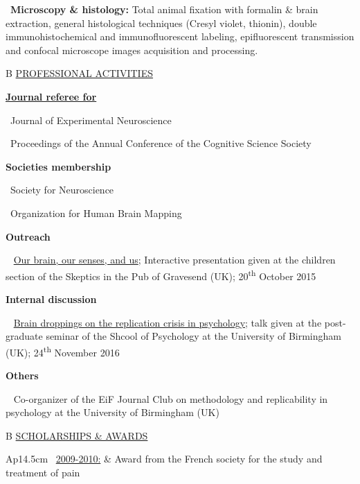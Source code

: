 \documentclass[a4paper,12pt,oneside]{letter}
\begin{document}
{\textbullet~\textbf{Microscopy \& histology:} Total animal fixation with formalin \& brain extraction, general histological techniques (Cresyl violet, thionin), double immunohistochemical and immunofluorescent labeling, epifluorescent transmission and confocal microscope images acquisition and processing.


\medskip 

\begin{tabular}{B}
 \underline{PROFESSIONAL ACTIVITIES}
\end{tabular}


\href{http://publons.com/author/1205193/remi-gau#profile}{\textbf{Journal referee for} }

\textbullet~Journal of Experimental Neuroscience

\textbullet~Proceedings of the Annual Conference of the Cognitive Science Society


\textbf{Societies membership}

\textbullet~Society for Neuroscience

\textbullet~Organization for Human Brain Mapping


\textbf{Outreach}

\textbullet~ \href{https://dx.doi.org/10.6084/m9.figshare.4535423.v1}{Our brain, our senses, and us}; Interactive presentation given at the children section of the Skeptics in the Pub of Gravesend (UK); 20\textsuperscript{th} October 2015


\textbf{Internal discussion}

\textbullet~ \href{https://dx.doi.org/10.6084/m9.figshare.4257992.v1}{Brain droppings on the replication crisis in psychology}; talk given at the post-graduate seminar of the Shcool of Psychology at the University of Birmingham (UK); 24\textsuperscript{th} November 2016


\textbf{Others}

\textbullet~ Co-organizer of the EiF Journal Club on methodology and replicability in psychology at the University of Birmingham (UK)



\medskip 

\begin{tabular}{B}
 \underline{SCHOLARSHIPS \& AWARDS}
\end{tabular}

\begin{tabular}{Ap{14.5cm}}
\textbullet~\underline{2009-2010:} & Award from the French society for the study and treatment of pain\\
     

\end{tabular}}
\end{document}
